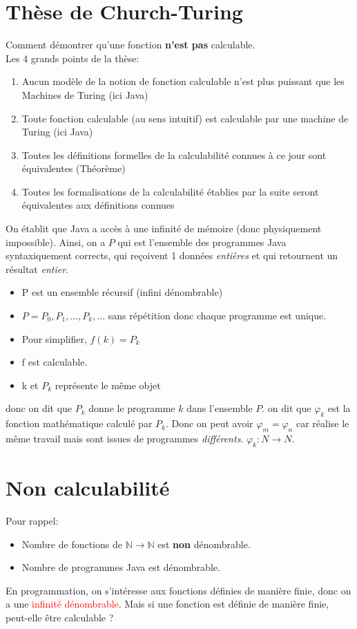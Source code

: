 \documentclass{report}
\begin{document}
\section{Thèse de Church-Turing}
Comment démontrer qu'une fonction \textbf{n'est pas} calculable.\\
Les 4 grands points de la thèse:
\begin{enumerate}
\item Aucun modèle de la notion de fonction calculable n’est plus puissant que les Machines de Turing (ici Java)
\item Toute fonction calculable (au sens intuitif) est calculable par une machine de Turing (ici Java)
\item Toutes les définitions formelles de la calculabilité connues à ce jour sont équivalentes (Théorème)
\item Toutes les formalisations de la calculabilité établies par la suite seront
équivalentes aux définitions connues
\end{enumerate}
On établit que Java a accès à une infinité de mémoire (donc physiquement impossible). Ainsi, on a $P$ qui est l'ensemble des programmes Java syntaxiquement corrects, qui reçoivent 1 données \textit{entières} et qui retournent un résultat \textit{entier}.
\begin{itemize}
\item P est un ensemble récursif (infini dénombrable)
\item $P = P_0, P_1, ..., P_k, ...$ sans répétition donc chaque programme est unique.
\item Pour simplifier, $f(k) = P_k$
\item f est calculable.
\item k et $P_k$ représente le même objet
\end{itemize}

donc on dit que $P_k$ donne le programme $k$ dans l'ensemble $P$. on dit que $\varphi_k$ est la fonction mathématique calculé par $P_k$. Donc on peut avoir $\varphi_m = \varphi_n$ car réalise le même travail mais sont issues de programmes \textit{différents}. $\varphi_k: N \rightarrow N$. 

\section{Non calculabilité}
Pour rappel:
\begin{itemize}
\item Nombre de fonctions de $\mathbb{N} \rightarrow \mathbb{N}$ est \textbf{non} dénombrable.
\item Nombre de programmes Java est dénombrable.
\end{itemize}
En programmation, on s'intéresse aux fonctions définies de manière finie, donc on a une \textcolor{red}{infinité dénombrable}. Mais si une fonction est définie de manière finie, peut-elle être calculable ?
\end{document}

